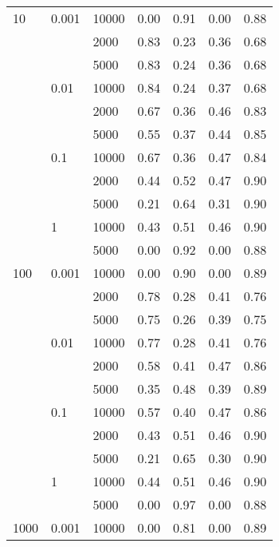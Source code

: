 \begin{tabular}{lllrrrr}
10 & 0.001 & 10000 &       0.00 &       0.91 &       0.00 &       0.88 \\
      &       & 2000 &       0.83 &       0.23 &       0.36 &       0.68 \\
      &       & 5000 &       0.83 &       0.24 &       0.36 &       0.68 \\
      & 0.01 & 10000 &       0.84 &       0.24 &       0.37 &       0.68 \\
      &       & 2000 &       0.67 &       0.36 &       0.46 &       0.83 \\
      &       & 5000 &       0.55 &       0.37 &       0.44 &       0.85 \\
      & 0.1 & 10000 &       0.67 &       0.36 &       0.47 &       0.84 \\
      &       & 2000 &       0.44 &       0.52 &       0.47 &       0.90 \\
      &       & 5000 &       0.21 &       0.64 &       0.31 &       0.90 \\
      & 1 & 10000 &       0.43 &       0.51 &       0.46 &       0.90 \\
      &       & 5000 &       0.00 &       0.92 &       0.00 &       0.88 \\
100 & 0.001 & 10000 &       0.00 &       0.90 &       0.00 &       0.89 \\
      &       & 2000 &       0.78 &       0.28 &       0.41 &       0.76 \\
      &       & 5000 &       0.75 &       0.26 &       0.39 &       0.75 \\
      & 0.01 & 10000 &       0.77 &       0.28 &       0.41 &       0.76 \\
      &       & 2000 &       0.58 &       0.41 &       0.47 &       0.86 \\
      &       & 5000 &       0.35 &       0.48 &       0.39 &       0.89 \\
      & 0.1 & 10000 &       0.57 &       0.40 &       0.47 &       0.86 \\
      &       & 2000 &       0.43 &       0.51 &       0.46 &       0.90 \\
      &       & 5000 &       0.21 &       0.65 &       0.30 &       0.90 \\
      & 1 & 10000 &       0.44 &       0.51 &       0.46 &       0.90 \\
      &       & 5000 &       0.00 &       0.97 &       0.00 &       0.88 \\
1000 & 0.001 & 10000 &       0.00 &       0.81 &       0.00 &       0.89 \\

\end{tabular}
